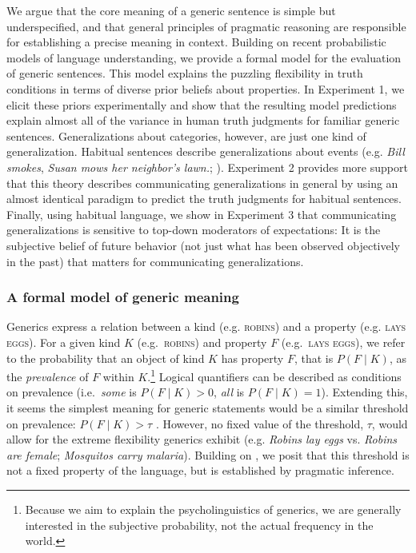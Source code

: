 \documentclass[11pt,letterpaper]{article}
\begin{document}
We argue that the core meaning of a generic sentence is simple but underspecified, and that general principles of pragmatic reasoning are responsible for establishing a precise meaning in context. 
Building on recent probabilistic models of language understanding, we provide a formal model for the evaluation of generic sentences. 
This model explains the puzzling flexibility in truth conditions in terms of diverse prior beliefs about properties.
In Experiment 1, we elicit these priors experimentally and show that the resulting model predictions explain almost all of the variance in human truth judgments for familiar  generic sentences.
Generalizations about categories, however, are just one kind of generalization.
Habitual sentences describe generalizations about events (e.g. \emph{Bill smokes}, \emph{Susan mows her neighbor's lawn.}; ). 
Experiment 2 provides more support that this theory describes communicating generalizations in general by using an almost identical paradigm to predict the truth judgments for habitual sentences.
Finally, using habitual language, we show in Experiment 3 that communicating generalizations is sensitive to top-down moderators of expectations: It is the subjective belief of future behavior (not just what has been observed objectively in the past) that matters for communicating generalizations.

\subsubsection*{A formal model of generic meaning}

Generics express a relation between a kind (e.g. \textsc{robins}) and a property (e.g. \textsc{lays eggs}). 
For a given kind $K$ (e.g.~\textsc{robins}) and property $F$ (e.g.~\textsc{lays eggs}), we refer to the probability that an object of kind $K$ has property $F$, that is $P(F\mid K)$, as the \emph{prevalence} of $F$ within $K$.\footnote{Because we aim to explain the psycholinguistics of generics, we are generally interested in the subjective probability, not the actual frequency in the world.}
Logical quantifiers can be described as conditions on prevalence (i.e.~\emph{some} is $P(F\mid K)>0$, \emph{all} is $P(F\mid K)=1$). 
Extending this, it seems the simplest meaning for generic statements would be a similar threshold on prevalence: $P(F\mid K)>\tau$ \cite{Cohen1999}. 
However, no fixed value of the threshold, $\tau$, would allow for the extreme flexibility generics exhibit (e.g. \emph{Robins lay eggs} vs. \emph{Robins are female}; \emph{Mosquitos carry malaria}).
Building on , we posit that this threshold is not a fixed property of the language, but is established by pragmatic inference.
\end{document}
